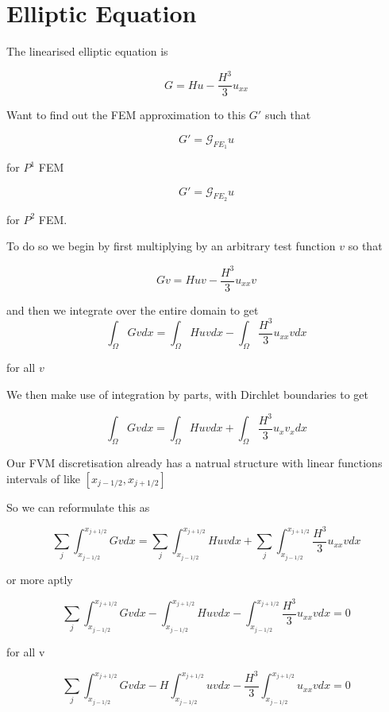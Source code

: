 \documentclass[12pt]{article}
\begin{document}
\section{Elliptic Equation}
The linearised elliptic equation is

\[G = Hu - \frac{H^3}{3}u_{xx}\]

Want to find out the FEM approximation to this $G'$ such that

\[G' = \mathcal{G}_{FE_1} u\]

for $P^1$ FEM

\[G' = \mathcal{G}_{FE_2} u\]

for $P^2$ FEM.

To do so we begin by first multiplying by an arbitrary test function $v$ so that

\[Gv = Huv - \frac{H^3}{3}u_{xx}v\]

and then we integrate over the entire domain to get 
\[\int_\Omega Gv dx = \int_\Omega Huv dx - \int_\Omega \frac{H^3}{3}u_{xx}vdx\]

for all $v$

We then make use of integration by parts, with Dirchlet boundaries to get

\[\int_\Omega Gv dx = \int_\Omega Huv dx + \int_\Omega \frac{H^3}{3}u_{x}v_xdx\]

Our FVM discretisation already has a natrual structure with linear functions intervals of like $[x_{j- 1/2} , x_{j+1/2}]$

So we can reformulate this as 

\[\sum_{j}\int_{x_{j-1/2}}^{x_{j+1/2}} Gv dx = \sum_{j}\int_{x_{j-1/2}}^{x_{j+1/2}} Huv dx + \sum_{j}\int_{x_{j-1/2}}^{x_{j+1/2}} \frac{H^3}{3}u_{xx}vdx\]

or more aptly

\[\sum_{j}\int_{x_{j-1/2}}^{x_{j+1/2}} Gv dx - \int_{x_{j-1/2}}^{x_{j+1/2}} Huv dx - \int_{x_{j-1/2}}^{x_{j+1/2}} \frac{H^3}{3}u_{xx}vdx = 0 \]

for all v

\[\sum_{j}\int_{x_{j-1/2}}^{x_{j+1/2}} Gv dx - H\int_{x_{j-1/2}}^{x_{j+1/2}} uv dx -  \frac{H^3}{3}\int_{x_{j-1/2}}^{x_{j+1/2}}u_{xx}vdx = 0 \]
\end{document}
